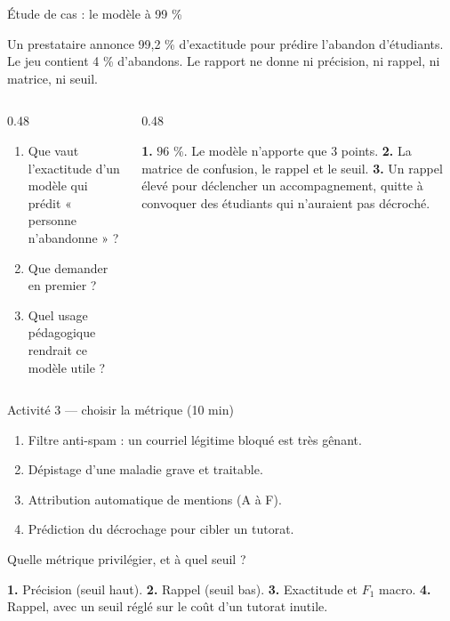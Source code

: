 \begin{frame}{Étude de cas : le modèle à 99 \%}
\begin{abox}[La situation]
Un prestataire annonce 99,2 \% d'exactitude pour prédire l'abandon d'étudiants.
Le jeu contient 4 \% d'abandons. Le rapport ne donne ni précision, ni rappel,
ni matrice, ni seuil.
\end{abox}
\vspace{1mm}
\begin{columns}[t]
\begin{column}{0.48\textwidth}
\begin{enumerate}
  \item Que vaut l'exactitude d'un modèle qui prédit « personne n'abandonne » ?
  \item Que demander en premier ?
  \item Quel usage pédagogique rendrait ce modèle utile ?
\end{enumerate}
\end{column}
\begin{column}{0.48\textwidth}
\begin{solbox}[Réponses]
\textbf{1.} $96$ \%. Le modèle n'apporte que 3 points.
\textbf{2.} La matrice de confusion, le rappel et le seuil.
\textbf{3.} Un rappel élevé pour déclencher un accompagnement, quitte à
convoquer des étudiants qui n'auraient pas décroché.
\end{solbox}
\end{column}
\end{columns}
\end{frame}

\begin{frame}{Activité 3 --- choisir la métrique (10 min)}
\begin{abox}
\begin{enumerate}
  \item Filtre anti-spam : un courriel légitime bloqué est très gênant.
  \item Dépistage d'une maladie grave et traitable.
  \item Attribution automatique de mentions (A à F).
  \item Prédiction du décrochage pour cibler un tutorat.
\end{enumerate}
Quelle métrique privilégier, et à quel seuil ?
\end{abox}
\vspace{1mm}
\begin{solbox}[Réponses]
\textbf{1.} Précision (seuil haut). \textbf{2.} Rappel (seuil bas).
\textbf{3.} Exactitude et $F_1$ macro. \textbf{4.} Rappel, avec un seuil réglé
sur le coût d'un tutorat inutile.
\end{solbox}
\end{frame}

